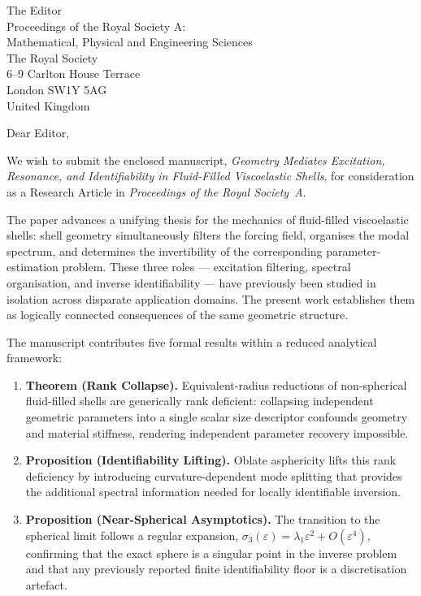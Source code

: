 \documentclass[12pt]{letter}
\date{\today}
\begin{document}
\begin{letter}{The Editor\\
Proceedings of the Royal Society A:\\
Mathematical, Physical and Engineering Sciences\\
The Royal Society\\
6--9 Carlton House Terrace\\
London SW1Y 5AG\\
United Kingdom}

\opening{Dear Editor,}

We wish to submit the enclosed manuscript, \emph{Geometry Mediates Excitation,
Resonance, and Identifiability in Fluid-Filled Viscoelastic Shells}, for
consideration as a Research Article in \emph{Proceedings of the Royal Society~A}.

The paper advances a unifying thesis for the mechanics of fluid-filled
viscoelastic shells: shell geometry simultaneously filters the forcing field,
organises the modal spectrum, and determines the invertibility of the
corresponding parameter-estimation problem.  These three roles --- excitation
filtering, spectral organisation, and inverse identifiability --- have
previously been studied in isolation across disparate application domains.  The
present work establishes them as logically connected consequences of the same
geometric structure.

The manuscript contributes five formal results within a reduced analytical
framework:
\begin{enumerate}
  \item \textbf{Theorem (Rank Collapse).} Equivalent-radius reductions of
    non-spherical fluid-filled shells are generically rank deficient: collapsing
    independent geometric parameters into a single scalar size descriptor
    confounds geometry and material stiffness, rendering independent parameter
    recovery impossible.

  \item \textbf{Proposition (Identifiability Lifting).} Oblate asphericity lifts
    this rank deficiency by introducing curvature-dependent mode splitting that
    provides the additional spectral information needed for locally identifiable
    inversion.

  \item \textbf{Proposition (Near-Spherical Asymptotics).} The transition to the
    spherical limit follows a regular expansion,
    $\sigma_3(\varepsilon) = \lambda_1 \varepsilon^2 + O(\varepsilon^4)$,
    confirming that the exact sphere is a singular point in the inverse problem
    and that any previously reported finite identifiability floor is a
    discretisation artefact.


\end{enumerate}
\end{letter}
\end{document}
